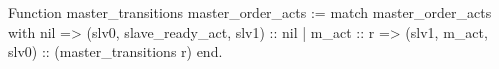 Function master_transitions master_order_acts :=
  match master_order_acts with
    nil             => (slv0, slave_ready_act, slv1) :: nil
  | m_act :: r => (slv1, m_act, slv0) :: (master_transitions  r)
  end.